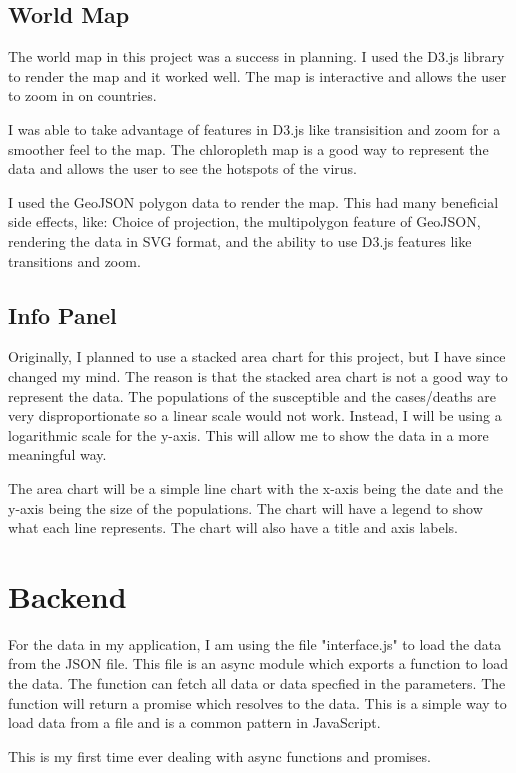 \documentclass{report}
\begin{document}
\subsection{World Map}
The world map in this project was a success in planning. I used the D3.js library to render the map and it worked well. The map is interactive and allows the user to zoom in on countries.

I was able to take advantage of features in D3.js like transisition and zoom for a smoother feel to the map. The chloropleth map is a good way to represent the data and allows the user to see the hotspots of the virus.

I used the GeoJSON polygon data to render the map. This had many beneficial side effects, like: Choice of projection, the multipolygon feature of GeoJSON, rendering the data in SVG format, and the ability to use D3.js features like transitions and zoom.

\subsection{Info Panel}
Originally, I planned to use a stacked area chart for this project, but I have since changed my mind. The reason is that the stacked area chart is not a good way to represent the data. The populations of the susceptible and the cases/deaths are very disproportionate so a linear scale would not work. Instead, I will be using a logarithmic scale for the y-axis. This will allow me to show the data in a more meaningful way.

The area chart will be a simple line chart with the x-axis being the date and the y-axis being the size of the populations. The chart will have a legend to show what each line represents. The chart will also have a title and axis labels.

\section{Backend}
For the data in my application, I am using the file "interface.js" to load the data from the JSON file. This file is an async module which exports a function to load the data. The function can fetch all data or data specfied in the parameters. The function will return a promise which resolves to the data. This is a simple way to load data from a file and is a common pattern in JavaScript.

This is my first time ever dealing with async functions and promises.
\end{document}
